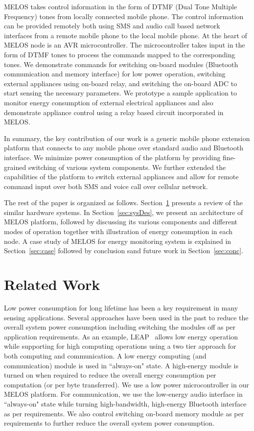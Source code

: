 \documentclass[10pt]{sigplan-proc-varsize}
\newcommand{\secref}[1]{Section~\ref{#1}}
\newcommand{\melos}{MELOS }
\newcommand{\melosnospace}{MELOS}
\begin{document}
\melos takes control information in the form of DTMF (Dual Tone Multiple Frequency) tones from locally connected mobile phone. The control information can be provided remotely both using SMS and audio call based network interfaces from a remote mobile phone to the local mobile phone. At the heart of \melos node is an AVR microcontroller. The microcontroller takes input in the form of DTMF tones to process the commands mapped to the corresponding tones. We demonstrate commands for switching on-board modules (Bluetooth communication and memory interface) for low power operation, switching external appliances using on-board relay, and switching the on-board ADC to start sensing the necessary parameters. We prototype a sample application to monitor energy consumption of external electrical appliances and also demonstrate appliance control using a relay based circuit incorporated in \melosnospace.  

In summary, the key contribution of our work is a generic mobile phone extension platform that connects to any mobile phone over standard audio and Bluetooth interface. We minimize power consumption of the platform by providing fine-grained switching of various system components. We further extended the capabilities of the platform to switch external appliances and allow for remote command input over both SMS and voice call over cellular network. 

The rest of the paper is organized as follows. \secref{sec:rw} presents a review of the similar hardware systems. In \secref{sec:sysDes}, we present an architecture of \melos platform, followed by discussing its various components and different modes of operation together with illustration of energy consumption in each node. A case study of \melos for energy monitoring system is explained in \secref{sec:case} followed by conclusion sand future work in \secref{sec:conc}.

\section{Related Work}
\label{sec:rw}
Low power consumption for long lifetime has been a key requirement in many sensing applications. Several approaches have been used in the past to reduce the overall system power consumption including switching the modules off as per application requirements. As an example, LEAP~\cite{LEAP} allows low energy operation while supporting for high computing operations using a two tier approach for both computing and communication. A low energy computing (and communication) module is used in ``always-on" state. A high-energy module is turned on when required to reduce the overall energy consumption per computation (or per byte transferred). We use a low power microcontroller in our \melos platform. For communication, we use the low-energy audio interface in ``always-on" state while turning high-bandwidth, high-energy Bluetooth interface as per requirements. We also control switching on-board memory module as per requirements to further reduce the overall system power consumption. 
\end{document}
